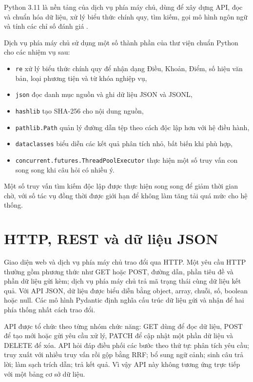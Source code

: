 \documentclass[12pt,a4paper,oneside]{report}
\begin{document}

Python 3.11 là nền tảng của dịch vụ phía máy chủ, dùng để xây dựng API, đọc và chuẩn hóa dữ liệu, xử lý biểu thức chính quy, tìm kiếm, gọi mô hình ngôn ngữ và tính các chỉ số đánh giá \cite{python311_docs}.

Dịch vụ phía máy chủ sử dụng một số thành phần của thư viện chuẩn Python cho các nhiệm vụ sau:
\begin{itemize}
  \item \texttt{re} xử lý biểu thức chính quy để nhận dạng Điều, Khoản, Điểm, số hiệu văn bản, loại phương tiện và từ khóa nghiệp vụ,
  \item \texttt{json} đọc danh mục nguồn và ghi dữ liệu JSON và JSONL,
  \item \texttt{hashlib} tạo SHA-256 cho nội dung nguồn,
  \item \texttt{pathlib.Path} quản lý đường dẫn tệp theo cách độc lập hơn với hệ điều hành,
  \item \texttt{dataclasses} biểu diễn các kết quả phân tích nhỏ, bất biến khi phù hợp,
  \item \texttt{concurrent.futures.ThreadPoolExecutor} thực hiện một số truy vấn con song song khi câu hỏi có nhiều ý.
\end{itemize}

Một số truy vấn tìm kiếm độc lập được thực hiện song song để giảm thời gian chờ, với số tác vụ đồng thời được giới hạn để không làm tăng tải quá mức cho hệ thống.


\section{HTTP, REST và dữ liệu JSON}
Giao diện web và dịch vụ phía máy chủ trao đổi qua HTTP. Một yêu cầu HTTP thường gồm phương thức như GET hoặc POST, đường dẫn, phần tiêu đề và phần dữ liệu gửi kèm; dịch vụ phía máy chủ trả mã trạng thái cùng dữ liệu kết quả. Với API JSON, dữ liệu được biểu diễn bằng object, array, chuỗi, số, boolean hoặc null. Các mô hình Pydantic định nghĩa cấu trúc dữ liệu gửi và nhận để hai phía thống nhất cách trao đổi.

API được tổ chức theo từng nhóm chức năng: GET dùng để đọc dữ liệu, POST để tạo mới hoặc gửi yêu cầu xử lý, PATCH để cập nhật một phần dữ liệu và DELETE để xóa. API hỏi đáp điều phối các bước theo thứ tự: phân tích yêu cầu; truy xuất với nhiều truy vấn rồi gộp bằng RRF; bổ sung ngữ cảnh; sinh câu trả lời; làm sạch trích dẫn; trả kết quả. Vì vậy API này không tương ứng trực tiếp với một bảng cơ sở dữ liệu.
\end{document}
